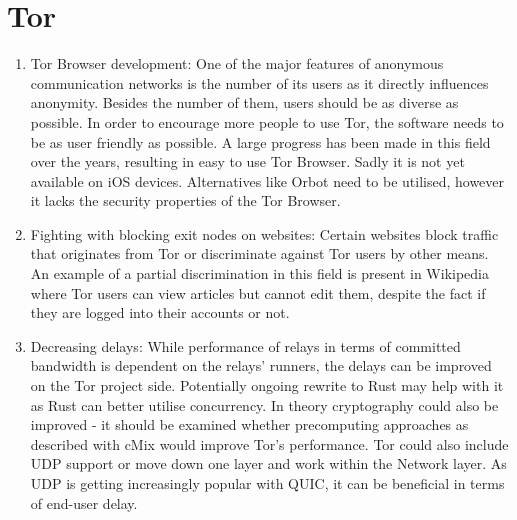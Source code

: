 \section{Tor}
\begin{enumerate}
    \item Tor Browser development: One of the major features of anonymous communication networks is the number of its users as it directly influences anonymity. Besides the number of them, users should be as diverse as possible. In order to encourage more people to use Tor, the software needs to be as user friendly as possible. A large progress has been made in this field over the years, resulting in easy to use Tor Browser. Sadly it is not yet available on iOS devices. Alternatives like Orbot need to be utilised, however it lacks the security properties of the Tor Browser.
    \item Fighting with blocking exit nodes on websites: Certain websites block traffic that originates from Tor or discriminate against Tor users by other means. An example of a partial discrimination in this field is present in Wikipedia where Tor users can view articles but cannot edit them, despite the fact if they are logged into their accounts or not.
    \item Decreasing delays: While performance of relays in terms of committed bandwidth is dependent on the relays’ runners, the delays can be improved on the Tor project side. Potentially ongoing rewrite to Rust may help with it as Rust can better utilise concurrency. In theory cryptography could also be improved - it should be examined whether precomputing approaches as described with cMix would improve Tor’s performance. Tor could also include UDP support or move down one layer and work within the Network layer. As UDP is getting increasingly popular with QUIC, it can be beneficial in terms of end-user delay.
\end{enumerate}

